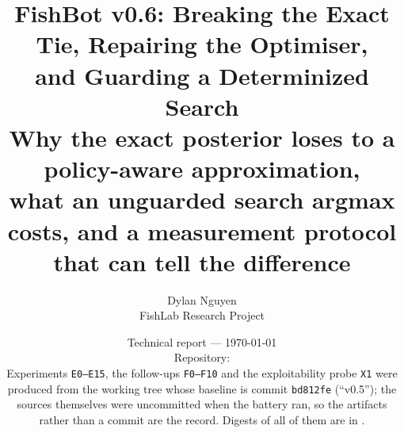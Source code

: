 \documentclass[11pt]{article}
\title{\textbf{FishBot v0.6: Breaking the Exact Tie, Repairing the Optimiser,\\
and Guarding a Determinized Search}\\[5pt]
\large Why the exact posterior loses to a policy-aware approximation,\\
what an unguarded search argmax costs, and a measurement protocol\\
that can tell the difference}
\author{Dylan Nguyen\\\small FishLab Research Project}
\date{%
  \small Technical report --- \today\\[2pt]
  \small Repository: \filepath{https://github.com/dylann29/fish-optimization}\\[1pt]
  \small Experiments \texttt{E0--E15}, the follow-ups \texttt{F0--F10} and the
  exploitability probe \texttt{X1} were produced from the \vsix{} working tree
  whose baseline is commit \texttt{bd812fe} (``v0.5''); the \vsix{} sources
  themselves were uncommitted when the battery ran, so the artifacts rather than
  a commit are the record. Digests of all of them are in
  \filepath{research/v06/results/MANIFEST.json}.%
}
\theoremstyle{definition}
\begin{document}
\maketitle
\thispagestyle{fancy}

\begin{abstract}

\end{abstract}


















\appendix









\end{document}
